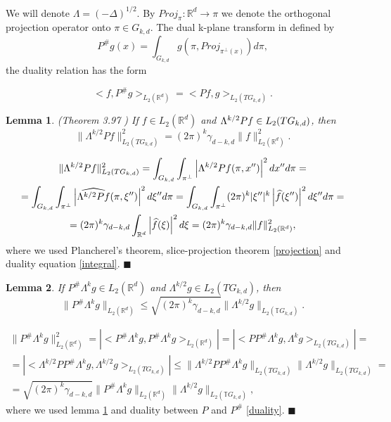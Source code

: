 \documentclass[12pt]{iopart}
\newtheorem{lemma}{Lemma}
\newenvironment{proof}
{\par\noindent{\bf Proof}}
{\hfill$\scriptstyle\blacksquare$}
\begin{document}
We will denote $\Lambda = (-\Delta)^{1/2}$. By $Proj_{\pi}:\mathbb R^d\rightarrow\pi$ we denote the orthogonal projection operator onto $\pi\in G_{k,d}$. The dual k-plane transform in defined by
$$P^\#g(x) = \int_{G_{k,d}}g(\pi,Proj_{\pi^\perp(x)})d\pi,$$
the duality relation has the form \cite{MA}

\begin{equation}
\label{duality}
<f,P^\#g>_{L_2(\mathbb R^d)} = <Pf,g>_{L_2(TG_{k,d})}.
\end{equation}

\begin{lemma} (Theorem 3.97 \cite{MA})
\label{isometry}
If $f\in L_2(\mathbb R^d)$ and $\Lambda^{k/2}Pf\in L_2(\mathbb \mathfrak TG_{k,d})$, then
$$\|\Lambda^{k/2}Pf\|^2_{L_2(TG_{k,d})}=(2\pi)^k\gamma_{d-k,d}\|f\|^2_{L_2(\mathbb R^d)}.$$
\end{lemma}

\begin{proof}
\begin{multline*}
\|\Lambda^{k/2}Pf\|^2_{L_2(TG_{k,d})}=\int_{G_{k,d}}\int_{\pi^\perp}\left|\Lambda^{k/2}Pf(\pi,x'')\right|^2dx''d\pi=\\
=\int_{G_{k,d}}\int_{\pi^\perp}\left|\widehat{\Lambda^{k/2}Pf}(\pi,\xi'')\right|^2d\xi''d\pi=\int_{G_{k,d}}\int_{\pi^\perp}(2\pi)^k|\xi''|^k\left|\widehat{f}(\xi'')\right|^2d\xi''d\pi=\\
=(2\pi)^k\gamma_{d-k,d}\int_{\mathbb R^d}\left|\widehat{f}(\xi)\right|^2d\xi =(2\pi)^k\gamma_{d-k,d}\|f\|^2_{L_2(\mathbb R^d)},$$
\end{multline*}
where we used Plancherel's theorem, slice-projection theorem \ref{projection} and duality equation \eqref{integral}.
\end{proof}

\begin{lemma}
\label{lemma2}
If $P^\#\Lambda^kg\in L_2(\mathbb R^d)$ and $\Lambda^{k/2}g\in L_2(TG_{k,d})$, then
$$\|P^\#\Lambda^kg\|_{L_2(\mathbb R^d)}\le\sqrt{(2\pi)^k\gamma_{d-k,d}}\|\Lambda^{k/2}g\|_{L_2(\mathbb TG_{k,d})}.$$
\end{lemma}

\begin{proof}
\begin{multline*}
\|P^\#\Lambda^kg\|_{L_2(\mathbb R^d)}^2=|<P^\#\Lambda^kg,P^\#\Lambda^kg>_{L_2(\mathbb R^d)}|=|<PP^\#\Lambda^kg,\Lambda^kg>_{L_2(TG_{k,d})}|=\\
=|<\Lambda^{k/2}PP^\#\Lambda^kg,\Lambda^{k/2}g>_{L_2(TG_{k,d})}|\le\|\Lambda^{k/2}PP^\#\Lambda^kg\|_{L_2(TG_{k,d})}\|\Lambda^{k/2}g\|_{L_2(TG_{k,d})}=\\
=\sqrt{(2\pi)^k\gamma_{d-k,d}}\|P^\#\Lambda^kg\|_{L_2(\mathbb R^d)}\|\Lambda^{k/2}g\|_{L_2(\mathbb TG_{k,d})},
\end{multline*}
where we used lemma \ref{isometry} and duality between $P$ and $P^\#$ \ref{duality}.
\end{proof}
\end{document}
